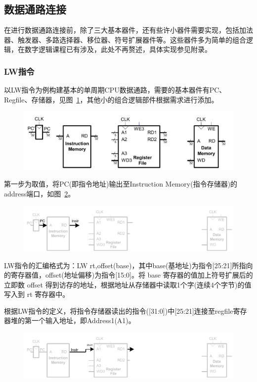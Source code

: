 \subsection{数据通路连接}
在进行数据通路连接前，除了三大基本器件，还有些许小器件需要实现，包括加法器、触发器、多路选择器、移位器、符号扩展器件等。这些器件多为简单的组合逻辑，在数字逻辑课程已有涉及，此处不再赘述，具体实现参见附录。

\subsubsection{LW指令}
以LW指令为例构建基本的单周期CPU数据通路，需要的基本器件有PC、Regfile、存储器，见图~\ref{fig:0_MIPS_state_elements}，其他小的组合逻辑部件根据需求进行添加。

\begin{figure}[htbp]
	\centering
	\includegraphics[width=1.0\textwidth]{image/0_MIPS_state_elements.pdf}
	\caption{\label{fig:0_MIPS_state_elements}}
\end{figure}

第一步为取值，将PC(即指令地址)输出至Instruction Memory(指令存储器)的address端口，如图~\ref{fig:1_lw_fetch}。

\begin{figure}[htbp] 
	\centering
	\includegraphics[width=1.0\textwidth]{image/1_lw_fetch.pdf}
	\caption{\label{fig:1_lw_fetch}}
\end{figure}

LW指令的汇编格式为：LW rt,offset(base)，其中base(基地址)为指令[25:21]所指向的寄存器值，offset(地址偏移)为指令[15:0]。将 base 寄存器的值加上符号扩展后的立即数 offset 得到访存的地址，根据地址从存储器中读取1个字(连续4个字节)的值写入到 rt 寄存器中。

根据LW指令的定义，将指令存储器读出的指令([31:0])中[25:21]连接至regfile寄存器堆的第一个输入地址，即Address1(A1)。
\begin{figure}[htbp]
	\centering
	\includegraphics[width=1.0\textwidth]{image/2_lw_register_read.pdf}
	\caption{\label{fig:2_lw_register_read}}
\end{figure}

